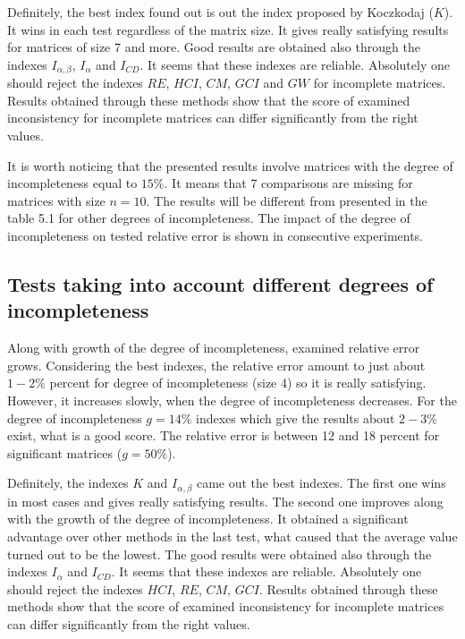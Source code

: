 Definitely, the best index found out is out the index proposed by Koczkodaj ($K$). It wins in each test regardless of the matrix size. It gives really satisfying results for matrices of size 7 and more. Good results are obtained also through the indexes $I_{\alpha,\beta}$, $I_{\alpha}$ and $I_{CD}$. It seems that these indexes are reliable. Absolutely one should reject the indexes $RE$, $HCI$, $CM$, $GCI$ and $GW$ for incomplete matrices. Results obtained through these methods show that the score of examined inconsistency for incomplete matrices can differ significantly from the right values.

It is worth noticing that the presented results involve matrices with the degree of incompleteness equal to $15\%$. It means that 7 comparisons are missing for matrices with size $n = 10$. The results will be different from presented in the table 5.1 for other degrees of incompleteness. The impact of the degree of incompleteness on tested relative error is shown in consecutive experiments.

\subsection{Tests taking into account different degrees of incompleteness}
Along with growth of the degree of incompleteness, examined relative error grows. Considering the best indexes, the relative error amount to just about $1 - 2\%$ percent for degree of incompleteness (size 4) so it is really satisfying. However, it increases slowly, when the degree of incompleteness decreases. For the degree of incompleteness $g=14\%$ indexes which give the results about $2 - 3 \%$ exist, what is a good score. The relative error is between 12 and 18 percent for significant matrices ($g=50\%$).

Definitely, the indexes $K$ and $I_{\alpha,\beta}$ came out the best indexes. The first one wins in most cases and gives really satisfying results. The second one improves along with the growth of the degree of incompleteness. It obtained a significant advantage over other methods in the last test, what caused that the average value turned out to be the lowest. 
The good results were obtained also through the indexes $I_{\alpha}$ and $I_{CD}$. It seems that these indexes are reliable. Absolutely one should reject the indexes $HCI$, $RE$, $CM$, $GCI$. Results obtained through these methods show that the score of examined inconsistency for incomplete matrices can differ significantly from the right values.

